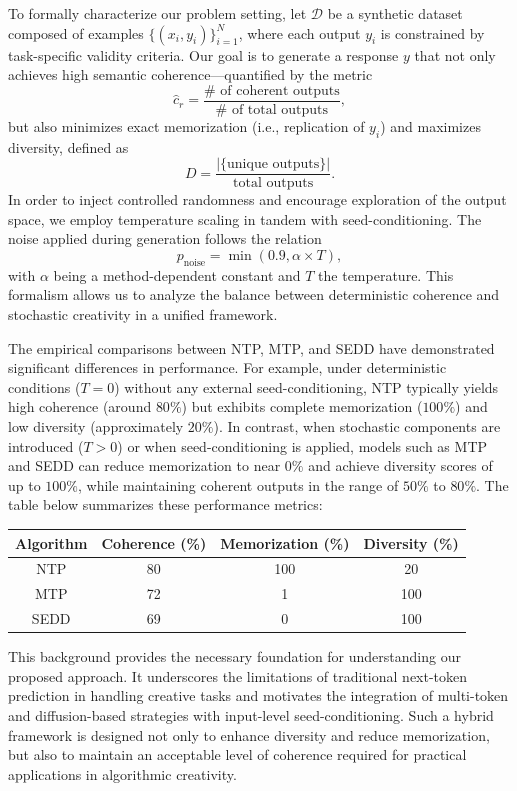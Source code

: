 \documentclass{article} %
\begin{document}
To formally characterize our problem setting, let \(\mathcal{D}\) be a synthetic dataset composed of examples \( \{(x_i, y_i)\}_{i=1}^N \), where each output \(y_i\) is constrained by task-specific validity criteria. Our goal is to generate a response \(y\) that not only achieves high semantic coherence—quantified by the metric 
\[
\hat{c}_r = \frac{\# \text{ of coherent outputs}}{\# \text{ of total outputs}},
\]
but also minimizes exact memorization (i.e., replication of \(y_i\)) and maximizes diversity, defined as 
\[
D = \frac{|\{ \text{unique outputs} \}|}{\text{total outputs}}.
\]
In order to inject controlled randomness and encourage exploration of the output space, we employ temperature scaling in tandem with seed-conditioning. The noise applied during generation follows the relation 
\[
p_{\text{noise}} = \min(0.9, \alpha \times T),
\]
with \(\alpha\) being a method-dependent constant and \(T\) the temperature. This formalism allows us to analyze the balance between deterministic coherence and stochastic creativity in a unified framework.

The empirical comparisons between NTP, MTP, and SEDD have demonstrated significant differences in performance. For example, under deterministic conditions (\(T=0\)) without any external seed-conditioning, NTP typically yields high coherence (around \(80\%\)) but exhibits complete memorization (\(100\%\)) and low diversity (approximately \(20\%\)). In contrast, when stochastic components are introduced (\(T>0\)) or when seed-conditioning is applied, models such as MTP and SEDD can reduce memorization to near \(0\%\) and achieve diversity scores of up to \(100\%\), while maintaining coherent outputs in the range of \(50\%\) to \(80\%\). The table below summarizes these performance metrics:

\begin{center}
\begin{tabular}{|c|c|c|c|}
\hline
Algorithm & Coherence (\%) & Memorization (\%) & Diversity (\%) \\
\hline
NTP  & 80   & 100   & 20 \\
MTP  & 72   & 1     & 100 \\
SEDD & 69   & 0     & 100 \\
\hline
\end{tabular}
\end{center}

This background provides the necessary foundation for understanding our proposed approach. It underscores the limitations of traditional next-token prediction in handling creative tasks and motivates the integration of multi-token and diffusion-based strategies with input-level seed-conditioning. Such a hybrid framework is designed not only to enhance diversity and reduce memorization, but also to maintain an acceptable level of coherence required for practical applications in algorithmic creativity.
\end{document}
